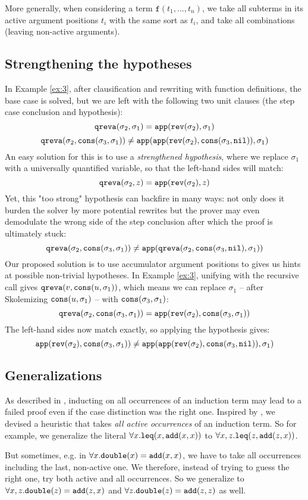 More generally, when considering a term $\mathtt{f}(t_1,...,t_n)$, we take all subterms in its active argument positions $t_i$ with the same sort as $t_i$, and take all combinations (leaving non-active arguments).
\subsection{Strengthening the hypotheses}
In Example \ref{ex:3}, after clausification and rewriting with function definitions, the base case is solved, but we are left with the following two unit clauses (the step case conclusion and hypothesis):
$$\mathtt{qreva}(\sigma_2,\sigma_1)=\mathtt{app}(\mathtt{rev}(\sigma_2),\sigma_1)$$
$$\mathtt{qreva}(\sigma_2,\mathtt{cons}(\sigma_3,\sigma_1))\neq\mathtt{app}(\mathtt{app}(\mathtt{rev}(\sigma_2),\mathtt{cons}(\sigma_3,\mathtt{nil})),\sigma_1)$$
An easy solution for this is to use a \textit{strengthened hypothesis}, where we replace $\sigma_1$ with a universally quantified variable, so that the left-hand sides will match:
$$\mathtt{qreva}(\sigma_2,z)=\mathtt{app}(\mathtt{rev}(\sigma_2),z)$$
Yet, this "too strong" hypothesis can backfire in many ways: not only does it burden the solver by more potential rewrites but the prover may even demodulate the wrong side of the step conclusion after which the proof is ultimately stuck:
$$\mathtt{qreva}(\sigma_2,\mathtt{cons}(\sigma_3,\sigma_1))\neq\mathtt{app}(\mathtt{qreva}(\sigma_2,\mathtt{cons}(\sigma_3,\mathtt{nil}),\sigma_1))$$
Our proposed solution is to use accumulator argument positions to gives us hints at possible non-trivial hypotheses. In Example \ref{ex:3}, unifying with the recursive call gives $\mathtt{qreva}(v, \mathtt{cons}(u,\sigma_1))$, which means we can replace $\sigma_1$ -- after Skolemizing $\mathtt{cons}(u,\sigma_1)$ -- with $\mathtt{cons}(\sigma_3,\sigma_1)$:
$$\mathtt{qreva}(\sigma_2,\mathtt{cons}(\sigma_3,\sigma_1))=\mathtt{app}(\mathtt{rev}(\sigma_2),\mathtt{cons}(\sigma_3,\sigma_1))$$
The left-hand sides now match exactly, so applying the hypothesis gives:
$$\mathtt{app}(\mathtt{rev}(\sigma_2),\mathtt{cons}(\sigma_3,\sigma_1))\neq\mathtt{app}(\mathtt{app}(\mathtt{rev}(\sigma_2),\mathtt{cons}(\sigma_3,\mathtt{nil})),\sigma_1)$$

\subsection{Generalizations}
As described in \cite{vampiregeneralization}, inducting on all occurrences of an induction term may lead to a failed proof even if the case distinction was the right one. Inspired by \cite{cruanes}, we devised a heuristic that takes \textit{all active occurrences} of an induction term. So for example, we generalize the literal $\forall x.\mathtt{leq}(x,\mathtt{add}(x,x))$ to $\forall x,z.\mathtt{leq}(z,\mathtt{add}(z,x))$.

But sometimes, e.g. in $\forall x.\mathtt{double}(x) = \mathtt{add}(x,x)$, we have to take all occurrences including the last, non-active one. We therefore, instead of trying to guess the right one, try both active and all occurrences. So we generalize to $\forall x,z.\mathtt{double}(z) = \mathtt{add}(z,x)$ and $\forall z.\mathtt{double}(z) = \mathtt{add}(z,z)$ as well.

